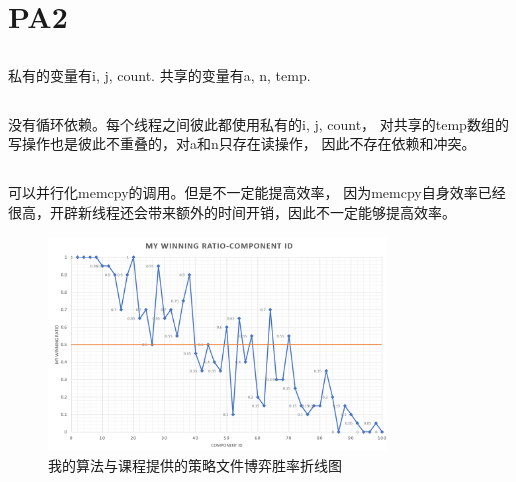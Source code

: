 \documentclass[UTF8]{article}
\begin{document}
\section{PA2}
\subsection{}
私有的变量有i, j, count. 共享的变量有a, n, temp.
\subsection{}
没有循环依赖。每个线程之间彼此都使用私有的i, j, count，
对共享的temp数组的写操作也是彼此不重叠的，对a和n只存在读操作，
因此不存在依赖和冲突。
\subsection{}
可以并行化memcpy的调用。但是不一定能提高效率，
因为memcpy自身效率已经很高，开辟新线程还会带来额外的时间开销，因此不一定能够提高效率。

\begin{figure}[h]
    \label{Ratio}
    \centering
        \includegraphics[width=0.8\textwidth]{Ratio.png}
        \caption{我的算法与课程提供的策略文件博弈胜率折线图}
    \end{figure}



\end{document}
